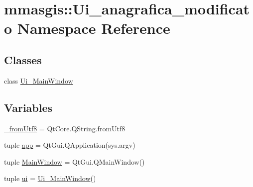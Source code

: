 \hypertarget{namespacemmasgis_1_1Ui__anagrafica__modificato}{
\section{mmasgis::Ui\_\-anagrafica\_\-modificato Namespace Reference}
\label{namespacemmasgis_1_1Ui__anagrafica__modificato}
}
\subsection*{Classes}
\begin{DoxyCompactItemize}
\item 
class \hyperlink{classmmasgis_1_1Ui__anagrafica__modificato_1_1Ui__MainWindow}{Ui\_\-MainWindow}
\end{DoxyCompactItemize}
\subsection*{Variables}
\begin{DoxyCompactItemize}
\item 
\hyperlink{namespacemmasgis_1_1Ui__anagrafica__modificato_ae9668e3865bcfb3029dd4a23c99563f2}{\_\-fromUtf8} = QtCore.QString.fromUtf8
\item 
tuple \hyperlink{namespacemmasgis_1_1Ui__anagrafica__modificato_ac84fd3431693fef91a33e9994788e27a}{app} = QtGui.QApplication(sys.argv)
\item 
tuple \hyperlink{namespacemmasgis_1_1Ui__anagrafica__modificato_ab6c175c64e281f61dac1694097c9073c}{MainWindow} = QtGui.QMainWindow()
\item 
tuple \hyperlink{namespacemmasgis_1_1Ui__anagrafica__modificato_ada6b63e4dd4d05cb754094e327e27e77}{ui} = \hyperlink{classmmasgis_1_1Ui__anagrafica__modificato_1_1Ui__MainWindow}{Ui\_\-MainWindow}()
\end{DoxyCompactItemize}


